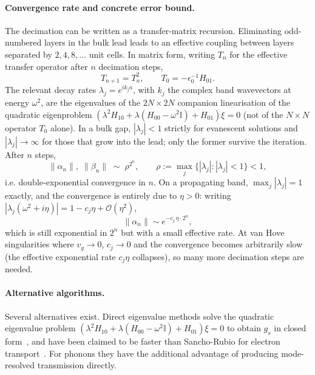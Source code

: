 \paragraph{Convergence rate and concrete error bound.}
The decimation can be written as a transfer-matrix recursion. Eliminating
odd-numbered layers in the bulk lead leads to an effective
coupling between layers separated by $2,4,8,\ldots$ unit cells. In
matrix form, writing $T_n$ for the effective transfer operator after
$n$ decimation steps,
\begin{equation}\label{eq:Tn_recursion}
  T_{n+1} = T_n^2,
  \qquad
  T_0 = -\epsilon_0^{-1} H_{01}.
\end{equation}
The relevant decay rates $\lambda_j = e^{i k_j a}$, with $k_j$ the complex band
wavevectors at energy $\omega^2$, are the eigenvalues of the $2N\times2N$
companion linearisation of the quadratic eigenproblem
$(\lambda^2 H_{10}+\lambda(H_{00}-\omega^2\mathbb{I})+H_{01})\xi=0$ (not of the
$N\times N$ operator $T_0$ alone). In a bulk gap,
$|\lambda_j| < 1$ strictly for evanescent solutions and
$|\lambda_j|\to\infty$ for those that grow into the lead; only the
former survive the iteration. After $n$ steps,
\begin{equation}\label{eq:sr_decay}
  \|\alpha_n\|,\;\|\beta_n\| \;\sim\; \rho^{2^n},
  \qquad
  \rho := \max_j\bigl\{|\lambda_j|: |\lambda_j|<1\bigr\} < 1,
\end{equation}
i.e.  double-exponential convergence in $n$. On a
propagating band, $\max_j |\lambda_j| = 1$ exactly, and the convergence
is entirely due to $\eta>0$: writing
$|\lambda_j(\omega^2 + i\eta)| = 1 - c_j \eta + \mathcal{O}(\eta^2)$,
\begin{equation}\label{eq:sr_decay_band}
  \|\alpha_n\|\sim e^{-c_j\,\eta\cdot 2^n},
\end{equation}
which is still exponential in $2^n$ but with a small effective rate.
At van Hove singularities where $v_g \to 0$, $c_j \to 0$ and the
convergence becomes arbitrarily slow (the effective exponential rate
$c_j\eta$ collapses), so many more decimation steps are needed.

\paragraph{Alternative algorithms.}
Several alternatives exist. Direct eigenvalue methods solve the
quadratic eigenvalue problem
$(\lambda^2 H_{10} + \lambda(H_{00} - \omega^2 \mathbb{I}) +
H_{01})\xi = 0$ to obtain $g_s$ in closed form~\cite{ando_quantum_1991,ong_efficient_2015},
and have been claimed to be faster than Sancho-Rubio for
electron transport~\cite{ong_efficient_2015}. For phonons they have the additional
advantage of producing mode-resolved transmission directly.

